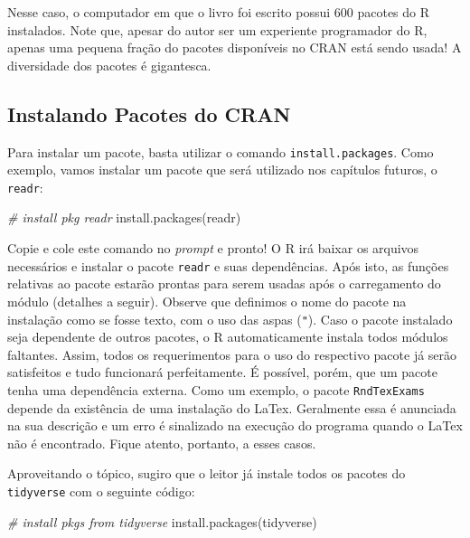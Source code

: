 \documentclass[
  11pt,
]{book}
\newenvironment{Shaded}{\begin{snugshade}}{\end{snugshade}}
\newcommand{\CommentTok}[1]{\textcolor[rgb]{0.37,0.37,0.37}{\textit{#1}}}
\newcommand{\FunctionTok}[1]{\textcolor[rgb]{0,0,0}{#1}}
\newcommand{\NormalTok}[1]{#1}
\newcommand{\StringTok}[1]{\textcolor[rgb]{0.5,0.5,0.5}{#1}}
\begin{document}
Nesse caso, o computador em que o livro foi escrito possui 600 pacotes do R instalados. Note que, apesar do autor ser um experiente programador do R, apenas uma pequena fração do pacotes disponíveis no CRAN está sendo usada! A diversidade dos pacotes é gigantesca.

\hypertarget{instalando-pacotes-do-cran}{%
\subsection{Instalando Pacotes do CRAN}\label{instalando-pacotes-do-cran}}

Para instalar um pacote, basta utilizar o comando \texttt{install.packages}. Como exemplo, vamos instalar um pacote que será utilizado nos capítulos futuros, o \texttt{readr}: 

\begin{Shaded}
\begin{Highlighting}[]
\CommentTok{\# install pkg readr}
\FunctionTok{install.packages}\NormalTok{(}\StringTok{\textquotesingle{}readr\textquotesingle{}}\NormalTok{)}
\end{Highlighting}
\end{Shaded}

Copie e cole este comando no \emph{prompt} e pronto! O R irá baixar os arquivos necessários e instalar o pacote \texttt{readr} e suas dependências. Após isto, as funções relativas ao pacote estarão prontas para serem usadas após o carregamento do módulo (detalhes a seguir). Observe que definimos o nome do pacote na instalação como se fosse texto, com o uso das aspas (\texttt{"}). Caso o pacote instalado seja dependente de outros pacotes, o R automaticamente instala todos módulos faltantes. Assim, todos os requerimentos para o uso do respectivo pacote já serão satisfeitos e tudo funcionará perfeitamente. É possível, porém, que um pacote tenha uma dependência externa. Como um exemplo, o pacote \texttt{RndTexExams} depende da existência de uma instalação do LaTex. Geralmente essa é anunciada na sua descrição e um erro é sinalizado na execução do programa quando o LaTex não é encontrado. Fique atento, portanto, a esses casos.

Aproveitando o tópico, sugiro que o leitor já instale todos os pacotes do \texttt{tidyverse} com o seguinte código:

\begin{Shaded}
\begin{Highlighting}[]
\CommentTok{\# install pkgs from tidyverse}
\FunctionTok{install.packages}\NormalTok{(}\StringTok{\textquotesingle{}tidyverse\textquotesingle{}}\NormalTok{)}
\end{Highlighting}
\end{Shaded}
\end{document}
